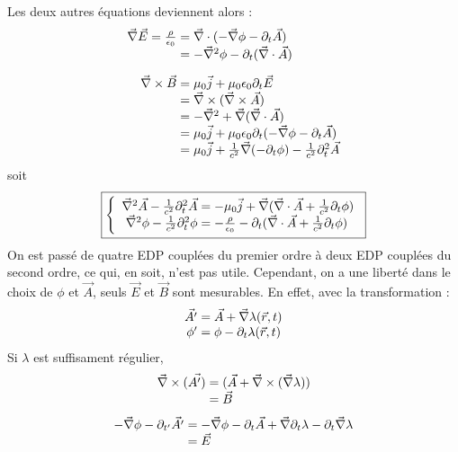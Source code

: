 	Les deux autres équations deviennent alors :
$$
	\begin{array}{r@{\;}l}
		\nab\vec{E}=\frac{\rho}{\epsilon_0}&=\nab\cdot(-\nab\phi-\partial_t\vec{A})\\
		&=-\nab^2\phi-\partial_t(\nab\cdot\vec{A})\\[10pt]
		\nab\times\vec{B}&=\mu_0\vec{j}+\mu_0\epsilon_0\partial_t\vec{E}\\
		&=\nab\times(\nab\times\vec{A})\\
		&=-\nab^2+\nab(\nab\cdot\vec{A})\\
		&=\mu_0\vec{j}+\mu_0\epsilon_0\partial_t(-\nab\phi-\partial_t\vec{A})\\
		&=\mu_0\vec{j}+\frac{1}{c^2}\nab(-\partial_t\phi)-\frac{1}{c^2}\partial_t^2\vec{A}
	\end{array}
$$
	soit 
$$
	\boxed{\left\{ \begin{array}{{r@{\;}l}}
		\nab^2\vec{A}-\frac{1}{c^2}\partial_t^2\vec{A}&=-\mu_0\vec{j}+\nab(\nab\cdot\vec{A}+\frac{1}{c^2}\partial_t\phi)\\
		\nab^2\phi-\frac{1}{c^2}\partial_t^2\phi&=-\frac{\rho}{\epsilon_0}-\partial_t(\nab\cdot\vec{A}+\frac{1}{c^2}\partial_t\phi) 
	\end{array}\right.}
$$	
	On est passé de quatre EDP couplées du premier ordre à deux EDP couplées du second ordre, ce qui, en soit, n'est pas utile. Cependant, on a une liberté dans le choix de $\phi$ et $\vec{A}$, seuls $\vec{E}$ et $\vec{B}$ sont mesurables. En effet, avec la transformation :\\
$$
		\begin{array}{r@{\;}l}
				\vec{A'} &=\vec{A}+\nab\lambda(\vec{r},t)\\
			\phi'&=\phi-\partial_t\lambda(\vec{r},t)
		\end{array}\\
$$	
	Si $\lambda$ est suffisament régulier,\\
$$
		\begin{array}{r@{\;}l}
			\nab\times(\vec{A')}&=(\vec{A}+\nab\times(\nab\lambda))\\ 
			&=\vec{B}
		\end{array}
$$
$$
		\begin{array}{r@{\;}l}
			-\nab\phi-\partial_{t'}\vec{A'}&=-\nab\phi-\partial_t\vec{A}+\nab\partial_t\lambda-\partial_t\nab\lambda\\
			&=\vec{E}
		\end{array}
$$
	
